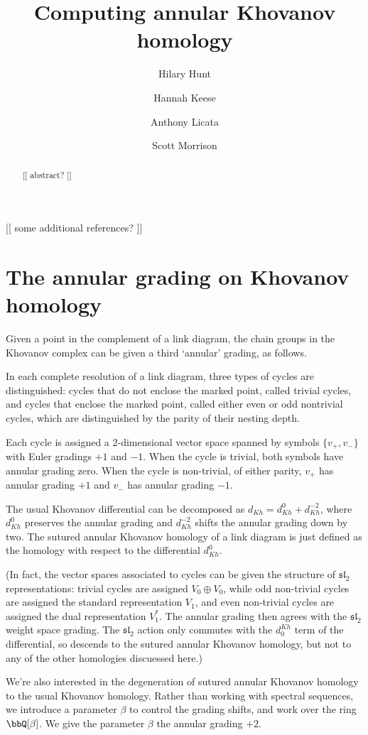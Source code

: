 \documentclass{amsart}
\title{Computing annular Khovanov homology}
\author{Hilary Hunt}
\author{Hannah Keese}
\author{Anthony Licata}
\author{Scott Morrison}
\theoremstyle{plain}
\newcommand{\nn}[1]{{\color{red} [[ #1 ]]}}
\newcommand{\fsl}{\mathfrak{sl}_2}
\begin{document}
\maketitle

\begin{abstract}
\nn{ abstract? }
\end{abstract}

\nn{ some additional references? }

\section{The annular grading on Khovanov homology}
Given a point in the complement of a link diagram, the chain groups in the Khovanov complex can be given a third `annular' grading, as follows.

In each complete resolution of a link diagram, three types of cycles are distinguished: cycles that do not enclose the marked point, called trivial cycles, and cycles that enclose the marked point, called either even or odd nontrivial cycles, which are distinguished by the parity of their nesting depth.

Each cycle is assigned a 2-dimensional vector space spanned by symbols $\{v_+, v_-\}$ with Euler gradings $+1$ and $-1$. When the cycle is trivial, both symbols have annular grading zero. When the cycle is non-trivial, of either parity, $v_+$ has annular grading $+1$ and $v_-$ has annular grading $-1$.

The usual Khovanov differential can be decomposed as $d_{Kh}=d_{Kh}^0+d_{Kh}^{-2}$, where $d_{Kh}^0$ preserves the annular grading and $d_{Kh}^{-2}$ shifts the annular grading down by two. The  sutured annular Khovanov homology of a link diagram is just defined as the homology with respect to the differential $d_{Kh}^0$.

(In fact, the vector spaces associated to cycles can be given the structure of $\fsl$ representations: trivial cycles are assigned $V_0 \oplus V_0$, while odd non-trivial cycles are assigned the standard representation $V_1$, and even non-trivial cycles are assigned the dual representation $V_1^*$. The annular grading then agrees with the $\fsl$ weight space grading. The $\fsl$ action only commutes with the $d^{Kh}_0$ term of the differential, so descends to the sutured annular Khovanov homology, but not to any of the other homologies discuessed here.)

We're also interested in the degeneration of sutured annular Khovanov homology to the usual Khovanov homology. Rather than working with spectral sequences, we introduce a parameter $\beta$ to control the grading shifts, and work over the ring $\bbQ[\beta]$. We give the parameter $\beta$ the annular grading $+2$. 
\end{document}
